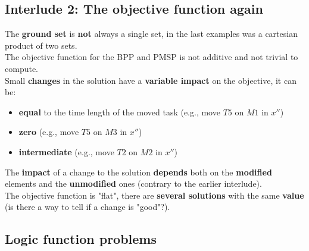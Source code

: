 \documentclass[11pt]{article}
\begin{document}
	\newpage
	
	\subsection*{Interlude 2: The objective function again}
	The \textbf{ground set} is \textbf{not} always a single set, in the last examples was a cartesian product of two sets. \\
	
	The objective function for the BPP and PMSP is not additive and not trivial to compute. \\
	
	Small \textbf{changes} in the solution have a \textbf{variable impact} on the objective, it can be: 
	\begin{itemize}
		\item \textbf{equal} to the time length of the moved task (e.g., move $T5$ on $M1$ in $x''$)
		\item \textbf{zero} (e.g., move $T5$ on $M3$ in $x''$)
		\item \textbf{intermediate} (e.g., move $T2$ on $M2$ in $x''$)
	\end{itemize}
	The \textbf{impact} of a change to the solution \textbf{depends} both on the \textbf{modified} elements and the \textbf{unmodified} ones (contrary to the earlier interlude).\\
	
	The objective function is "flat", there are \textbf{several solutions} with the same \textbf{value} (is there a way to tell if a change is "good"?).\\
	
	\newpage
	
	\subsection{Logic function problems}
\end{document}
